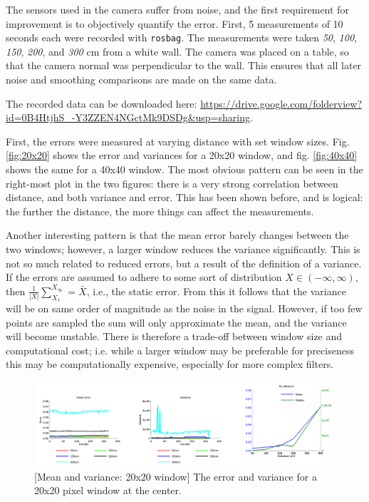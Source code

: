 \documentclass[11pt]{article}
\begin{document}
The sensors used in the camera suffer from noise, and the first requirement for
improvement is to objectively quantify the error. First, 5 measurements of 10
seconds each were recorded with \texttt{rosbag}. The measurements were taken
\emph{50}, \emph{100}, \emph{150}, \emph{200}, and \emph{300} cm from a white
wall. The camera was placed on a table, so that the camera normal was
perpendicular to the wall. This ensures that all later noise and smoothing
comparisons are made on the same data. 

The recorded data can be downloaded here: \url{
  https://drive.google.com/folderview?id=0B4HtjhS_-Y3ZZEN4NGctMk9DSDg&usp=sharing}.\par

First, the errors were measured at varying distance with set window
sizes. Fig. \vref{fig:20x20} shows the error and variances for a 20x20 window,
and fig. \vref{fig:40x40} shows the same for a 40x40 window. The most obvious
pattern can be seen in the right-most plot in the two figures: there is a very
strong correlation between distance, and both variance and error. This has been
shown before, and is logical: the further the distance, the more
things can affect the measurements. \par

Another interesting pattern is that the mean error barely changes between the
two windows; however, a larger window reduces the variance significantly. This
is not so much related to reduced errors, but a result of the definition of a
variance. If the errors are assumed to adhere to some sort of distribution
$X \in \left(-\infty, \infty \right)$, then $\frac{1}{\left|X\right|}\sum_{X_1}^{X_\infty} = \bar{X}$,
i.e., the static error. From this it follows that the variance will be
on same order of magnitude as the noise in the signal. However, if too few
points are sampled the sum will only approximate the mean, and the variance will
become unstable. There is therefore a trade-off between window size and
computational cost; i.e. while a larger window may be preferable for preciseness
this may be computationally expensive, especially for more complex filters. \par

\begin{figure}[ht]
  \includegraphics[width=1\textwidth]{figures/20x20-plot.png}
  [Mean and variance: 20x20 window]{\label{fig:20x20} The
    error and variance for a 20x20 pixel window at the center.}
\end{figure}
\end{document}
